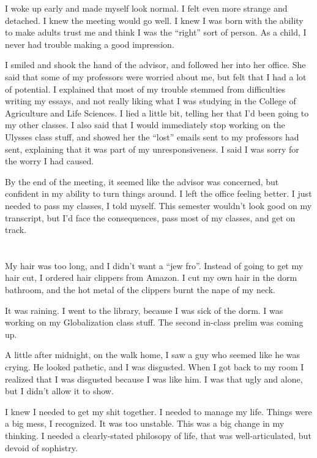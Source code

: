 I woke up early and made myself look normal.  I felt even more strange and
detached.  I knew the meeting would go well.  I knew I was born with the ability
to make adults trust me and think I was the ``right'' sort of person.  As a
child, I never had trouble making a good impression. 

I smiled and shook the hand of the advisor, and followed her into her office.
She said that some of my professors were worried about me, but felt that I had a
lot of potential.  I explained that most of my trouble stemmed from difficulties
writing my essays, and not really liking what I was studying in the College of
Agriculture and Life Sciences.  I lied a little bit, telling her that I'd been
going to my other classes.  I also said that I would immediately stop working on
the Ulysses class stuff, and showed her the ``lost'' emails sent to my
professors had sent, explaining that it was part of my unresponsiveness.  I said
I was sorry for the worry I had caused. 

By the end of the meeting, it seemed like the advisor was concerned, but
confident in my ability to turn things around.  I left the office feeling
better.  I just needed to pass my classes, I told myself.  This semester
wouldn't look good on my transcript, but I'd face the consequences, pass most of
my classes, and get on track.

\section{}

My hair was too long, and I didn't want a ``jew fro''.  Instead of going to get
my hair cut, I ordered hair clippers from Amazon.  I cut my own hair in the dorm
bathroom, and the hot metal of the clippers burnt the nape of my neck.  

It was raining.  I went to the library, because I was sick of the dorm.  I was
working on my Globalization class stuff.  The second in-class prelim was coming
up.

A little after midnight, on the walk home,  I saw a guy who seemed like he was
crying.  He looked pathetic, and I was disgusted.  When I got back to my room I
realized that I was disgusted because I was like him.  I was that ugly and
alone, but I didn't allow it to show. 

I knew I needed to get my shit together.  I needed to manage my life.  Things
were a big mess, I recognized.  It was too unstable.  This was a big change in
my thinking.  I needed a clearly-stated philosopy of life, that was
well-articulated, but devoid of sophistry.

